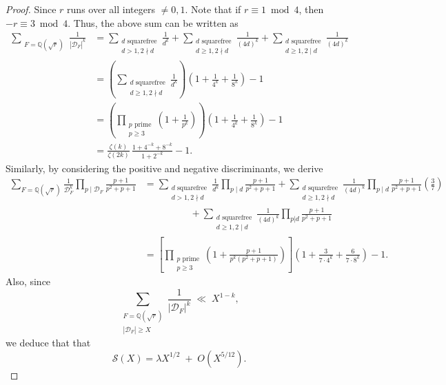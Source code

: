 \documentclass[11pt,reqno]{amsart}
\newcommand{\Q}{\mathbb{Q}}
\newcommand{\cD}{\mathcal{D}}
\newcommand{\cS}{\mathcal{S}}
\theoremstyle{definition}
\theoremstyle{remark}
\begin{document}
\begin{proof}
Since $r$ runs over all integers $\neq 0,1$. Note that if $r\equiv 1\bmod 4$, then $-r\equiv 3\bmod 4$. Thus, the above sum can be written as
\begin{align*}
    \sum_{\substack{F=\Q(\sqrt{r})}} \frac{1}{|\cD_F|^{k}} &= \sum_{\substack{d\text{ squarefree}\\ d> 1, 2\nmid d}} \frac{1}{d^k} +  \sum_{\substack{d\text{ squarefree}\\ d\geq 1, 2\nmid d}} \frac{1}{(4d)^k} +  \sum_{\substack{d\text{ squarefree}\\ d\geq 1, 2\mid d}} \frac{1}{(4d)^k}\\
    & =  \left(\sum_{\substack{d\text{ squarefree}\\ d\geq 1, 2\nmid d}} \frac{1}{d^k}\right) \left(1+ \frac{1}{4^k} + \frac{1}{8^k}\right)-1\\
    &= \left(\prod_{\substack{p \text{ prime}\\p\geq 3}}  \left(1+ \frac{1}{p^k}\right)\right)\left(1+ \frac{1}{4^k} + \frac{1}{8^k}\right)-1\\[2pt]
    & = \frac{\zeta(k)}{\zeta(2k)} \,\frac{1+ 4^{-k} + 8^{-k}}{1+2^{-k}} -1.
\end{align*}
Similarly, by considering the positive and negative discriminants, we derive
\begin{align*}
    \sum_{F=\Q(\sqrt{r})} \frac{1}{\cD_F^k} \prod_{p\mid \cD_F} \frac{p+1}{p^2+p+1}  &=  \sum_{\substack{d\text{ squarefree}\\ d> 1, 2\nmid d}} \frac{1}{d^k} \prod_{p\mid d} \frac{p+1}{p^2+p+1} +  \sum_{\substack{d\text{ squarefree}\\ d\geq 1, 2\nmid d}} \frac{1}{(4d)^k} \prod_{p\mid d} \frac{p+1}{p^2+p+1} \left(\frac{3}{7}\right)\\
    &\hspace{2cm} +  \sum_{\substack{d\text{ squarefree}\\ d\geq 1, 2\mid d}} \frac{1}{(4d)^k} \prod_{p|d} \frac{p+1}{p^2+p+1}\\
    & = \left[\prod_{\substack{p\text{ prime}\\ p \geq 3}} \left(1 + \frac{p+1}{p^k(p^2+p+1)}\right) \right] \left(1 + \frac{3}{7\cdot 4^k} + \frac{6}{7\cdot 8^k}\right) - 1.
\end{align*}
Also, since
$$
\sum_{\substack{F=\Q(\sqrt{r}) \\ |\cD_F|\ge X}} \frac{1}{|\cD_F|^{k}}
   \;\ll\;
   X^{1-k},
$$
we deduce that
that
$$
\cS(X)
   = \lambda 
   X^{1/2}
   \;+\;
   O\!\left(X^{5/12}\right).
$$
  \end{proof}
\end{document}
